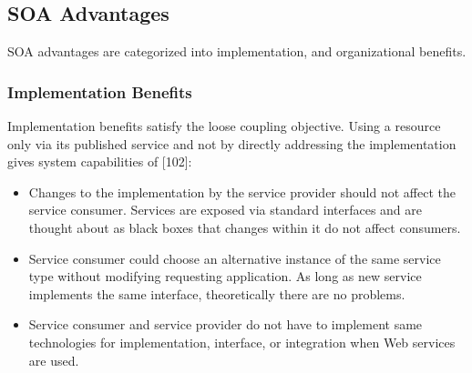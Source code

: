 \documentclass[12pt,a4paper,final,twoside,onecolumn,titlepage]{book}
\begin{document}
\subsection{SOA Advantages}
\gls{SOA} advantages are categorized into implementation, and organizational benefits. 
\subsubsection{Implementation Benefits}
Implementation benefits satisfy the loose coupling objective. Using a resource only via its published service and not by directly addressing the implementation gives system capabilities of [102]:
\begin{itemize}
\item Changes to the implementation by the service provider should not affect the service consumer. Services are exposed via standard interfaces and are thought about as black boxes that changes within it do not affect consumers.
\item Service consumer could choose an alternative instance of the same service type without modifying requesting application. As long as new service implements the same interface, theoretically there are no problems.
\item Service consumer and service provider do not have to implement same technologies for implementation, interface, or integration when Web services are used.
\end{itemize}
\end{document}

